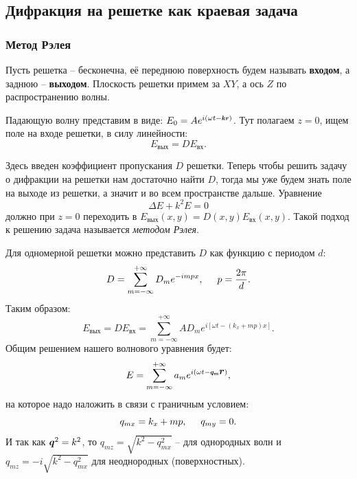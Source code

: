 \subsection{Дифракция на решетке как краевая задача}

\subsubsection{Метод Рэлея}
Пусть решетка -- бесконечна, её переднюю поверхность будем называть \textbf{входом}, а заднюю -- \textbf{выходом}. Плоскость решетки примем за $XY$, а ось $Z$ по распространению волны.

Падающую волну представим в виде: $E_0 = A e^{i (\omega t - \smallvc{k} \smallvc{r})}$.
Тут полагаем $z = 0$, ищем поле на входе решетки, в силу линейности: 
\begin{equation*}
	E_{\text{вых}} = D E_{\text{вх}}.	
\end{equation*}	


Здесь введен коэффициент пропускания $D$ решетки. 
Теперь чтобы решить задачу о дифракции на решетки нам достаточно найти $D$, тогда мы уже будем знать поле на выходе из решетки, а значит и во всем пространстве дальше. Уравнение
\begin{equation*}
	\Delta E + k^2 E = 0
\end{equation*}
должно при $z = 0$ переходить в $E_{\text{вых}}(x,y) = D(x,y) E_{\text{вх}}(x,y)$. Такой подход к решению задача называется \textit{методом Рэлея}.

Для одномерной решетки можно представить $D$ как функцию с периодом $d$:
\begin{equation*}
	D = \sum_{m =- \infty}^{+\infty}D_m e^{-i m p x},
	\hspace{0.5 cm}
	p =\frac{2 \pi}{d}.
\end{equation*}
Таким образом:
\begin{equation*}
	E_\text{вых} = D E_\text{вх} = \sum_{m = - \infty}^{+\infty} A D_m e^{i [\omega t - (k_x + m p)x]}.
\end{equation*}
Общим решением нашего волнового уравнения будет:
\begin{equation*}
	E = \sum_{m = - \infty}^{+\infty} a_m e^{i(\omega t - \smallvc{q_m} \vc{r})},
\end{equation*}
на которое надо наложить в связи с граничным условием:
\begin{equation*}
	q_{mx} = k_x + m p, \hspace{0.5 cm} q_{m y} = 0.
\end{equation*}
И так как $\mbox{\boldmath $q$}^2 = k^2$, то $q_{mz} = \sqrt{k^2 - q_{mx}^2}$ -- для однородных волн и $q_{mz} = -i \sqrt{k^2 - q_{mx}^2}$ для неоднородных (поверхностных).

